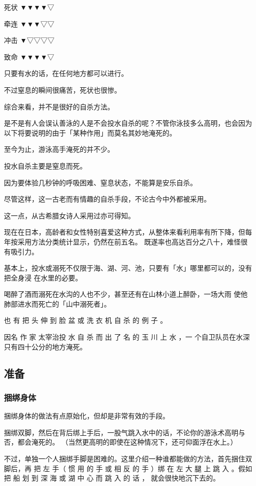 \documentclass[UTF8]{ctexart}
\begin{document}
死状 ▼▼▼▼▽

牵连 ▼▼▼▽▽

冲击 ▼▽▽▽▽

致命 ▼▼▼▼▽

只要有水的话，在任何地方都可以进行。

不过窒息的瞬间很痛苦，死状也很惨。

综合来看，并不是很好的自杀方法。

是不是有人会误认善泳的人是不会投水自杀的呢？不管你泳技多么高明，也会因为以下将要说明的由于「某种作用」而莫名其妙地淹死的。

至今为止，游泳高手淹死的并不少。

投水自杀主要是窒息而死。

因为要体验几秒钟的呼吸困难、窒息状态，不能算是安乐自杀。

尽管这样，这一古老而有情趣的自杀手段，不论古今中外都被采用。

这一点，从古希腊女诗人采用过亦可得知。

现在在日本，高龄者和女性特别喜爱这种方式，从整体来看利用率有所下降，但每年按采用方法分类统计显示，仍然在前五名。
既遂率也高达百分之八十，难怪很 有吸引力。 

基本上，投水或溺死不仅限于海、湖、河、池，只要有「水」哪里都可以的，没有把全身浸 在水里的必要。

喝醉了酒而溺死在水沟的人也不少，甚至还有在山林小道上醉卧，一场大雨 使他肺部进水而死亡的「山中溺死者」。

也 有 把 头 伸 到 脸 盆 或 洗 衣 机 自 杀 的 例 子 。

因名 作 家 太宰治投 水 自 杀 而 出 了 名 的 玉 川 上 水 ，一 个自卫队员在水深只有四十公分的地方淹死。

\subsection{准备}

\subsubsection*{捆绑身体}

捆绑身体的做法有点原始化，但却是非常有效的手段。

捆绑双脚，然后在背后绑上手后，一股气跳入水中的话，不论你的游泳术高明与否，都会淹死的。
（当然更高明的即使在这种情况下，还可仰面浮在水上。）

不过，单独一个人捆绑手脚是困难的。这里介绍一种谁都能做的方法，首先捆住双脚后，再 把 左 手（ 惯 用 的 手 或 相 反 的 手 ）绑 在 左 大 腿 上 跳 入 。假如 把 船 划 到 深 海 或 湖 中 心 而 跳 入 的 话 ， 就会很快地沉下去的。
\end{document}
